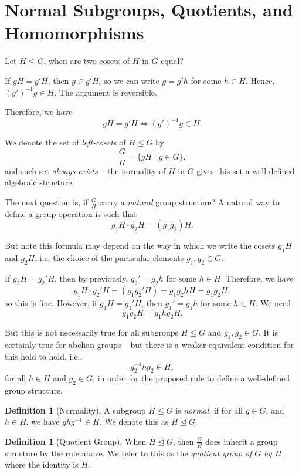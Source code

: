 \documentclass{article}
\theoremstyle{definition}
\newtheorem{definition}[theorem]{Definition}
\theoremstyle{remark}
\newcommand{\pqty}[1]{\left(#1\right)}
\newcommand{\set}[2]{\{#1\mid #2\}}
\newcommand{\flatfrac}[2]{\frac{#1}{#2}}
\newcommand{\inverse}{^{-1}}
\newcommand{\normalsub}{\trianglelefteq}
\newcommand{\subgroup}{\leq}
\begin{document}
\section{Normal Subgroups, Quotients, and Homomorphisms}

Let \(H \subgroup G\), when are two cosets of \(H\) in \(G\) equal?

If \(gH = g' H\), then \(g \in g' H\), so we can write \(g = g' h\) for some \(h \in H\). Hence, \(\pqty{g'}\inverse g \in H\). The argument is reversible.

Therefore, we have
\[
    gH = g' H \iff \pqty{g'}\inverse g \in H.
\]

We denote the set of \emph{left-cosets} of \(H \subgroup G\) by
\[
    \flatfrac{G}{H} = \set{gH}{g \in G},
\]
and such set \emph{always exists} -- the normality of \(H\) in \(G\) gives this set a well-defined algebraic structure.

The next question is, if \(\flatfrac{G}{H}\) carry a \emph{natural} group structure? A natural way to define a group operation is such that
\[
    g_1 H \cdot g_2 H = \pqty{g_1 g_2} H.
\]

But note this formula may depend on the way in which we write the cosets \(g_1 H\) and \(g_2 H\), i.e. the choice of the particular elements \(g_1, g_2 \in G\).

If \(g_2 H = g_2' H\), then by previously, \(g_2' = g_2 h\) for some \(h \in H\). Therefore, we have
\[
    g_1 H \cdot g_2' H = \pqty{g_1 g_2' H} = g_1 g_2 h H = g_1 g_2 H,
\]
so this is fine. However, if \(g_1 H = g_1' H\), then \(g_1' = g_1 h\) for some \(h \in H\). We need
\[
    g_1 g_2 H = g_1 h g_2 H.
\]

But this is not necessarily true for all subgroups \(H \subgroup G\) and \(g_1, g_2 \in G\). It is certainly true for abelian groups -- but there is a weaker equivalent condition for this hold to hold, i.e.,
\[
    g_2 \inverse h g_2 \in H,
\]
for all \(h \in H\) and \(g_2 \in G\), in order for the proposed rule to define a well-defined group structure.

\begin{definition}[Normality]
    \label{def:normality}%
    A subgroup \(H \subgroup G\) is \emph{normal}, if for all \(g \in G\), and \(h \in H\), we have \(g h g \inverse \in H\). We denote this as \(H \normalsub G\).
\end{definition}

\begin{definition}[Quotient Group]
    \label{def:quotient-group}%
    When \(H \normalsub G\), then \(\flatfrac{G}{H}\) does inherit a group structure by the rule above. We refer to this as the \emph{quotient group of \(G\) by \(H\)}, where the identity is \(H\).
\end{definition}
\end{document}
